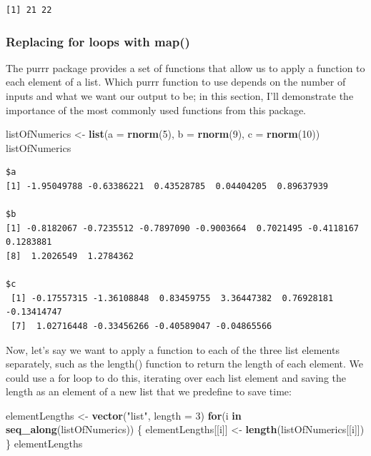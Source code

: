 \documentclass[
]{article}
\newenvironment{Shaded}{\begin{snugshade}}{\end{snugshade}}
\newcommand{\AttributeTok}[1]{\textcolor[rgb]{0.13,0.29,0.53}{#1}}
\newcommand{\ControlFlowTok}[1]{\textcolor[rgb]{0.13,0.29,0.53}{\textbf{#1}}}
\newcommand{\DecValTok}[1]{\textcolor[rgb]{0.00,0.00,0.81}{#1}}
\newcommand{\FunctionTok}[1]{\textcolor[rgb]{0.13,0.29,0.53}{\textbf{#1}}}
\newcommand{\NormalTok}[1]{#1}
\newcommand{\OtherTok}[1]{\textcolor[rgb]{0.56,0.35,0.01}{#1}}
\newcommand{\StringTok}[1]{\textcolor[rgb]{0.31,0.60,0.02}{#1}}
\begin{document}
\begin{verbatim}
[1] 21 22
\end{verbatim}

\subsubsection{Replacing for loops with
map()}\label{replacing-for-loops-with-map}

The purrr package provides a set of functions that allow us to apply a
function to each element of a list. Which purrr function to use depends
on the number of inputs and what we want our output to be; in this
section, I'll demonstrate the importance of the most commonly used
functions from this package.

\begin{Shaded}
\begin{Highlighting}[]
\NormalTok{listOfNumerics }\OtherTok{\textless{}{-}} \FunctionTok{list}\NormalTok{(}\AttributeTok{a =} \FunctionTok{rnorm}\NormalTok{(}\DecValTok{5}\NormalTok{),}
                       \AttributeTok{b =} \FunctionTok{rnorm}\NormalTok{(}\DecValTok{9}\NormalTok{),}
                       \AttributeTok{c =} \FunctionTok{rnorm}\NormalTok{(}\DecValTok{10}\NormalTok{))}
\NormalTok{listOfNumerics}
\end{Highlighting}
\end{Shaded}

\begin{verbatim}
$a
[1] -1.95049788 -0.63386221  0.43528785  0.04404205  0.89637939

$b
[1] -0.8182067 -0.7235512 -0.7897090 -0.9003664  0.7021495 -0.4118167  0.1283881
[8]  1.2026549  1.2784362

$c
 [1] -0.17557315 -1.36108848  0.83459755  3.36447382  0.76928181 -0.13414747
 [7]  1.02716448 -0.33456266 -0.40589047 -0.04865566
\end{verbatim}

Now, let's say we want to apply a function to each of the three list
elements separately, such as the length() function to return the length
of each element. We could use a for loop to do this, iterating over each
list element and saving the length as an element of a new list that we
predefine to save time:

\begin{Shaded}
\begin{Highlighting}[]
\NormalTok{elementLengths }\OtherTok{\textless{}{-}} \FunctionTok{vector}\NormalTok{(}\StringTok{"list"}\NormalTok{, }\AttributeTok{length =} \DecValTok{3}\NormalTok{)}
\ControlFlowTok{for}\NormalTok{(i }\ControlFlowTok{in} \FunctionTok{seq\_along}\NormalTok{(listOfNumerics)) \{}
\NormalTok{  elementLengths[[i]] }\OtherTok{\textless{}{-}} \FunctionTok{length}\NormalTok{(listOfNumerics[[i]])}
\NormalTok{\}}
\NormalTok{elementLengths}
\end{Highlighting}
\end{Shaded}
\end{document}
